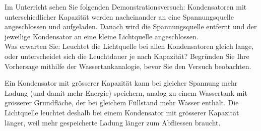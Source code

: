 \documentclass[addpoints,11pt,a4paper]{exam}
\newlength{\antwortraumlen}
\newcommand{\Antwortraum}[1]{%
  \pgfmathsetlength{\antwortraumlen}{#1*2.5cm}%
  \begin{answerbox}
    \rule{0pt}{\antwortraumlen}%
  \end{answerbox}%
}
\begin{document}
\newpage
\begin{questions}
\begin{groupbox}
\question[3] Im Unterricht sehen Sie folgenden Demonstrationsversuch:
Kondensatoren mit unterschiedlicher Kapazität werden nacheinander an eine
Spannungsquelle angeschlossen und aufgeladen. Danach wird die
Spannungsquelle entfernt und der jeweilige Kondensator an eine kleine
Lichtquelle angeschlossen.\\
Was erwarten Sie: Leuchtet die Lichtquelle bei allen Kondensatoren gleich
lange, oder unterscheidet sich die Leuchtdauer je nach Kapazität?
Begründen Sie Ihre Vorhersage mithilfe der Wassertankanalogie, bevor Sie
den Versuch beobachten.
\Antwortraum{3}

\begin{solution}
Ein Kondensator mit grösserer Kapazität kann bei gleicher Spannung mehr
Ladung (und damit mehr Energie) speichern, analog zu einem Wassertank mit
grösserer Grundfläche, der bei gleichem Füllstand mehr Wasser enthält. Die
Lichtquelle leuchtet deshalb bei einem Kondensator mit grösserer Kapazität
länger, weil mehr gespeicherte Ladung länger zum Abfliessen braucht.
\end{solution}
\end{groupbox}
\end{questions}
\end{document}
